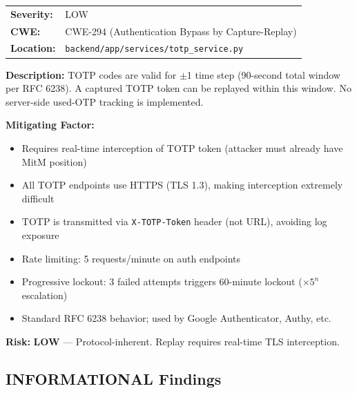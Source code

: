 \documentclass[11pt,a4paper]{article}
\begin{document}
\begin{tcolorbox}[colback=low!5, colframe=low, title=\textbf{S-05: TOTP Replay Within 90-Second Validity Window}]
\begin{tabularx}{\textwidth}{lX}
\textbf{Severity:} & \textcolor{low}{LOW} \\
\textbf{CWE:} & CWE-294 (Authentication Bypass by Capture-Replay) \\
\textbf{Location:} & \texttt{backend/app/services/totp\_service.py} \\
\end{tabularx}

\textbf{Description:} TOTP codes are valid for $\pm$1 time step (90-second total window per RFC 6238). A captured TOTP token can be replayed within this window. No server-side used-OTP tracking is implemented.

\textbf{Mitigating Factor:}
\begin{itemize}[nosep]
  \item Requires real-time interception of TOTP token (attacker must already have MitM position)
  \item All TOTP endpoints use HTTPS (TLS 1.3), making interception extremely difficult
  \item TOTP is transmitted via \texttt{X-TOTP-Token} header (not URL), avoiding log exposure
  \item Rate limiting: 5 requests/minute on auth endpoints
  \item Progressive lockout: 3 failed attempts triggers 60-minute lockout ($\times 5^n$ escalation)
  \item Standard RFC 6238 behavior; used by Google Authenticator, Authy, etc.
\end{itemize}

\textbf{Risk:} \textcolor{low}{\textbf{LOW}} --- Protocol-inherent. Replay requires real-time TLS interception.
\end{tcolorbox}

\subsection{INFORMATIONAL Findings}
\end{document}
